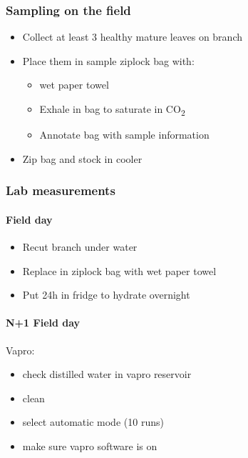 \documentclass[
  12pt,
  american,
  a4paper,
  extrafontsizes,onecolumn,openright
  ]{memoir}
\providecommand{\tightlist}{%
  \setlength{\itemsep}{0pt}\setlength{\parskip}{0pt}}
\begin{document}
\hypertarget{sampling-on-the-field}{%
\subsubsection{Sampling on the field}\label{sampling-on-the-field}}

\begin{itemize}
\tightlist
\item
  Collect at least 3 healthy mature leaves on branch
\item
  Place them in sample ziplock bag with:

  \begin{itemize}
  \tightlist
  \item
    wet paper towel
  \item
    Exhale in bag to saturate in CO\textsubscript{2}
  \item
    Annotate bag with sample information
  \end{itemize}
\item
  Zip bag and stock in cooler
\end{itemize}

\hypertarget{lab-measurements}{%
\subsubsection{Lab measurements}\label{lab-measurements}}

\hypertarget{field-day}{%
\paragraph{Field day}\label{field-day}}

\begin{itemize}
\tightlist
\item
  Recut branch under water
\item
  Replace in ziplock bag with wet paper towel
\item
  Put 24h in fridge to hydrate overnight
\end{itemize}

\hypertarget{n1-field-day}{%
\paragraph{N+1 Field day}\label{n1-field-day}}

Vapro:

\begin{itemize}
\tightlist
\item
  check distilled water in vapro reservoir
\item
  clean
\item
  select automatic mode (10 runs)
\item
  make sure vapro software is on
\end{itemize}
\end{document}
